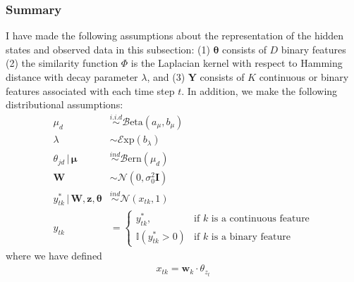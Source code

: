 \documentclass[12pt,letterpaper]{report}
\newcommand{\Norm}[2]{\mathcal{N}(#1,#2)}
\newcommand{\Exp}[1]{\mathcal{E}\mathrm{xp}(#1)}
\newcommand{\Bern}[1]{\mathcal{B}\mathrm{ern}\left(#1\right)}
\newcommand{\Beta}[2]{\mathcal{B}\mathrm{eta}(#1,#2)}
\newcommand{\given}{\, \vert \,}
\newcommand{\bY}{\mathbf{Y}}
\newcommand{\bz}{\mathbf{z}}
\newcommand{\bw}{\mathbf{w}}
\newcommand{\bW}{\mathbf{W}}
\newcommand{\btheta}{\boldsymbol{\theta}}
\newcommand{\bmu}{\boldsymbol{\mu}}
\begin{document}
\subsubsection{Summary}
\label{sec:summary}

I have made the following assumptions about the representation of the
hidden states and observed data in this subsection:
(1) $\btheta$ consists of $D$ binary features (2) the similarity function $\Phi$
is the Laplacian kernel with respect to Hamming distance with
decay parameter $\lambda$, and (3) $\bY$ consists of $K$ continuous or 
binary features associated with each time step $t$.  In addition, we
make the following distributional assumptions:
\begin{align}
\mu_d &\stackrel{i.i.d}{\sim} \Beta{a_{\mu}}{b_{\mu}} \\
\lambda &\sim \Exp{b_{\lambda}} \\
\theta_{jd} \given \bmu &\stackrel{ind}{\sim} \Bern{\mu_d} \\
\bW &\sim \Norm{0}{\sigma^2_0 \mathbf{I}} \\
y^*_{tk} \given \bW, \bz, \btheta &\stackrel{ind}{\sim} \Norm{x_{tk}}{1} \\
y_{tk} &= \begin{cases}
  y^*_{tk}, & \text{if $k$ is a continuous feature} \\
  \mathbb{I}(y^*_{tk} > 0) & \text{if $k$ is a binary feature}
\end{cases}
\end{align}
where we have defined
\begin{align}
  \label{eq:102}
  x_{tk} = \bw_k \cdot \theta_{z_t}
\end{align}
\end{document}
